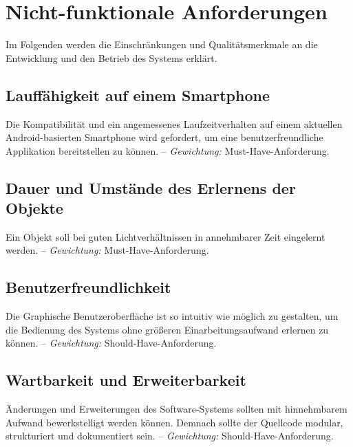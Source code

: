 \documentclass[oneside]{ausarbeitung}
\begin{document}
%
\section{Nicht-funktionale Anforderungen}
Im Folgenden werden die Einschränkungen und Qualitätsmerkmale an die Entwicklung und den Betrieb des Systems erklärt.

\subsection{Lauffähigkeit auf einem Smartphone}
Die Kompatibilität und ein angemessenes Laufzeitverhalten auf einem aktuellen Android-basierten Smartphone wird gefordert, um eine benutzerfreundliche Applikation bereitstellen zu können. -- \textit{Gewichtung:} Must-Have-Anforderung.

\subsection{Dauer und Umstände des Erlernens der Objekte}
Ein Objekt soll bei guten Lichtverhältnissen in annehmbarer Zeit eingelernt werden. -- \textit{Gewichtung:} Must-Have-Anforderung.

\subsection{Benutzerfreundlichkeit}
Die Graphische Benutzeroberfläche ist so intuitiv wie möglich zu gestalten, um die Bedienung des Systems ohne größeren Einarbeitungsaufwand erlernen zu können. -- \textit{Gewichtung:} Should-Have-Anforderung.

\subsection{Wartbarkeit und Erweiterbarkeit}
Änderungen und Erweiterungen des Software-Systems sollten mit hinnehmbarem Aufwand bewerkstelligt werden können. Demnach sollte der Quellcode modular, strukturiert und dokumentiert sein. -- \textit{Gewichtung:} Should-Have-Anforderung.
\end{document}
